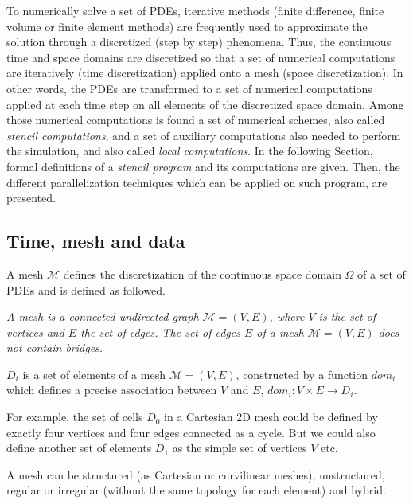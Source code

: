 To numerically solve a set of PDEs, iterative methods (finite difference, finite volume or finite element methods) are frequently used to approximate the solution through a discretized (step by step) phenomena. Thus, the continuous time and space domains are discretized so that a set of numerical computations are iteratively (time discretization) applied onto a mesh (space discretization). In other words, the PDEs are transformed to a set of numerical computations applied at each time step on all elements of the discretized space domain. Among those numerical computations is found a set of numerical schemes, also called \textit{stencil computations}, and a set of auxiliary computations also needed to perform the simulation, and also called \emph{local computations}.
In the following Section, formal definitions of a \textit{stencil program} and its computations are given. Then, the different parallelization techniques which can be applied on such program, are presented.

\subsection{Time, mesh and data}

A mesh $\mathcal{M}$ defines the discretization of the continuous space domain $\Omega$ of a set of PDEs and is defined as followed. 

\begin{mydef}
\textit{A mesh is a connected undirected graph $\mathcal{M}=(V,E)$, where $V$ is the set of vertices and $E$ the set of edges. The set of edges $E$ of a mesh $\mathcal{M}=(V,E)$ does not contain bridges.}
\end{mydef}

\begin{mydef}
$D_i$ is a set of elements of a mesh $\mathcal{M}=(V,E)$, constructed by a function $dom_i$ which defines a precise association between $V$ and $E$, $dom_i : V \times E \rightarrow D_i$.
\end{mydef}
For example, the set of cells $D_0$ in a Cartesian 2D mesh could be defined by exactly four vertices and four edges connected as a cycle. But we could also define another set of elements $D_1$ as the simple set of vertices $V$ etc.

A mesh can be structured (as Cartesian or curvilinear meshes), unstructured, regular or irregular (without the same topology for each element) and hybrid. 

